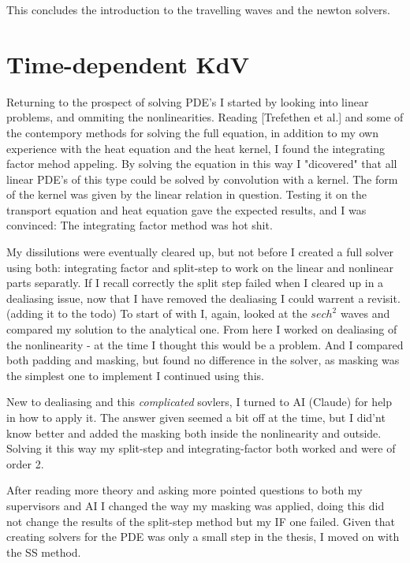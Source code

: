 This concludes the introduction to the travelling waves and the newton solvers. 


\section{Time-dependent KdV}
Returning to the prospect of solving PDE's I started by looking into linear problems, and ommiting the nonlinearities. 
Reading [Trefethen et al.] and some of the contempory methods for solving the full equation, 
in addition to my own experience with the heat equation and the heat kernel, I found the integrating factor mehod appeling.
By solving the equation in this way I "dicovered" that all linear PDE's of this type could be solved by convolution with a kernel. 
The form of the kernel was given by the linear relation in question. Testing it on the transport equation and heat equation gave the expected results,
and I was convinced: The integrating factor method was hot shit. 

My dissilutions were eventually cleared up, but not before I created a full solver using both:
integrating factor and split-step to work on the linear and nonlinear parts separatly. 
If I recall correctly the split step failed when I cleared up in a dealiasing issue,
now that I have removed the dealiasing I could warrent a revisit. (adding it to the todo)
To start of with I, again, looked at the $sech^2$ waves and compared my solution to the analytical one.
From here I worked on dealiasing of the nonlinearity - at the time I thought this would be a problem. And I compared both padding and masking, but found no 
difference in the solver, as masking was the simplest one to implement I continued using this. 

New to dealiasing and this \textit{complicated} sovlers, I turned to AI (Claude) for help in how to apply it. 
The answer given seemed a bit off at the time, but I did'nt know better and added the masking both inside the nonlinearity and outside.
Solving it this way my split-step and integrating-factor both worked and were of order 2. 

After reading more theory and asking more pointed questions to both my supervisors and AI I changed the way my masking was applied,
doing this did not change the results of the split-step method but my IF one failed. Given that creating solvers for the 
PDE was only a small step in the thesis, I moved on with the SS method. 

